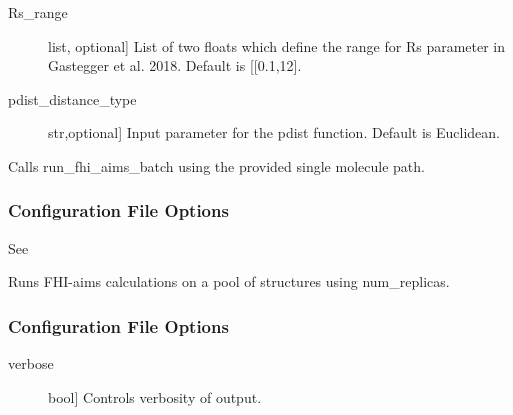 \documentclass[letterpaper,10pt,english]{sphinxmanual}
\begin{document}
\begin{fulllineitems}
\begin{fulllineitems}
\begin{description}
\item[{Rs\_range}] \leavevmode{[}list, optional{]}
List of two floats which define the range for Rs parameter in
Gastegger et al. 2018. Default is {[}{[}0.1,12{]}.

\item[{pdist\_distance\_type}] \leavevmode{[}str,optional{]}
Input parameter for the pdist function. Default is Euclidean.

\end{description}

\end{fulllineitems}


\begin{fulllineitems}
\label{\detokenize{index:Genarris.genarris_master.Genarris.Relax_Single_Molecule}}
Calls run\_fhi\_aims\_batch using the provided single molecule path.
\subsubsection*{Configuration File Options}

See {\hyperref[\detokenize{index:Genarris.genarris_master.Genarris.Run_FHI_Aims_Batch}]{}}

\end{fulllineitems}


\begin{fulllineitems}
\label{\detokenize{index:Genarris.genarris_master.Genarris.Run_FHI_Aims_Batch}}
Runs FHI-aims calculations on a pool of structures using num\_replicas.
\subsubsection*{Configuration File Options}
\begin{description}
\item[{verbose}] \leavevmode{[}bool{]}
Controls verbosity of output.


\end{description}
\end{fulllineitems}
\end{fulllineitems}
\end{document}
